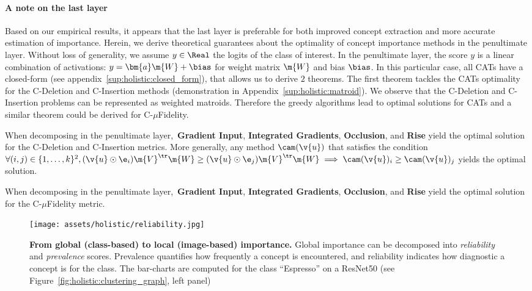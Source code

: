 \paragraph{A note on the last layer}
Based on our empirical results, it appears that the last layer is preferable for both improved concept extraction and more accurate estimation of importance. 
Herein, we derive theoretical guarantees about the optimality of concept importance methods in the penultimate layer. %
Without loss of generality, we assume $y \in \Real$ the logits of the class of interest. In the penultimate layer, the score $y$ is a linear combination of activations: $y=\bm{a}\m{W}+\bias$ for weight matrix $\m{W}$ and bias $\bias$. 
In this particular case, all CATs have a closed-form (see appendix~\ref{sup:holistic:closed_form}), that allows us to derive $2$ theorems. The first theorem tackles the CATs optimality for the C-Deletion and C-Insertion methods (demonstration in Appendix~\ref{sup:holistic:matroid}). We observe that the C-Deletion and C-Insertion problems can be represented as weighted matroids. Therefore the greedy algorithms lead to optimal solutions for CATs and a similar theorem could be derived for C-$\mu$Fidelity.
\begin{theorem}
When decomposing in the penultimate layer,~\textbf{Gradient Input}, \textbf{Integrated Gradients}, \textbf{Occlusion}, and \textbf{Rise} yield the optimal solution for the C-Deletion and C-Insertion metrics.
More generally, any method $\cam(\v{u})$ that satisfies the condition 
$\forall (i, j) \in \{1, \ldots, k\}^2, 
(\v{u} \odot \e_i) \m{V}^\tr\m{W} \geq (\v{u} \odot \e_j) \m{V}^\tr \m{W}
\implies 
\cam(\v{u})_i \geq \cam(\v{u})_j 
$ yields the optimal solution.
\end{theorem}
\begin{theorem}
When decomposing in the penultimate layer,~\textbf{Gradient Input}, \textbf{Integrated Gradients}, \textbf{Occlusion}, and \textbf{Rise} yield the optimal solution for the C-$\mu$Fidelity metric.
\end{theorem}


\begin{figure}[ht]
    \centering
    \texttt{[image: assets/holistic/reliability.jpg]}
    \caption{\textbf{From global (class-based) to local (image-based) importance.} Global importance can be decomposed into \textit{reliability} and \textit{prevalence} scores. Prevalence quantifies how frequently a concept is encountered, and reliability indicates how diagnostic a concept is for the class. The bar-charts are computed for the class ``Espresso'' on a ResNet50 (see Figure~\ref{fig:holistic:clustering_graph}, left panel)
    }
    \label{fig:holistic:barchart}
\end{figure}

